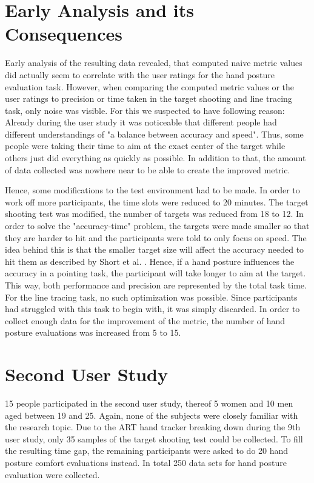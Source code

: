 \section{Early Analysis and its Consequences}

Early analysis of the resulting data revealed, that computed naive metric values did actually seem to correlate with the user ratings for the hand posture evaluation task. However, when comparing the computed metric values or the user ratings to precision or time taken in the target shooting and line tracing task, only noise was visible. 
For this we suspected to have following reason: Already during the user study it was noticeable that different people had different understandings of "a balance between accuracy and speed". Thus, some people were taking their time to aim at the exact center of the target while others just did everything as quickly as possible.
In addition to that, the amount of data collected was nowhere near to be able to create the improved metric.

Hence, some modifications to the test environment had to be made. In order to work off more participants, the time slots were reduced to 20 minutes. The target shooting test was modified, the number of targets was reduced from 18 to 12. In order to solve the "accuracy-time" problem, the targets were made smaller so that they are harder to hit and the participants were told to only focus on speed. The idea behind this is that the smaller target size will affect the accuracy needed to hit them as described by Short et al. \cite{short1999precision}. Hence, if a hand posture influences the accuracy in a pointing task, the participant will take longer to aim at the target. This way, both performance and precision are represented by the total task time. 
For the line tracing task, no such optimization was possible. Since participants had struggled with this task to begin with, it was simply discarded.
In order to collect enough data for the improvement of the metric, the number of hand posture evaluations was increased from 5 to 15.

\section{Second User Study}

15 people participated in the second user study, thereof 5 women and 10 men aged between 19 and 25. Again, none of the subjects were closely familiar with the research topic.
Due to the ART hand tracker breaking down during the 9th user study, only 35 samples of the target shooting test could be collected. To fill the resulting time gap, the remaining participants were asked to do 20 hand posture comfort evaluations instead.
In total 250 data sets for hand posture evaluation were collected.